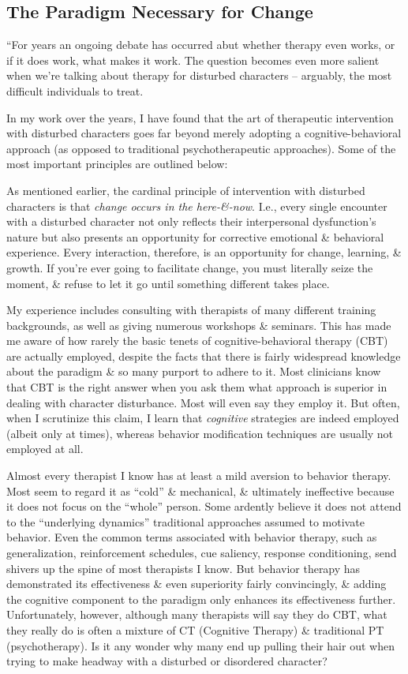 \documentclass{article}
\numberwithin{equation}{section}
\begin{document}
\subsection{The Paradigm Necessary for Change}
``For years an ongoing debate has occurred abut whether therapy even works, or if it does work, what makes it work. The question becomes even more salient when we're talking about therapy for disturbed characters -- arguably, the most difficult individuals to treat.

In my work over the years, I have found that the art of therapeutic intervention with disturbed characters goes far beyond merely adopting a cognitive-behavioral approach (as opposed to traditional psychotherapeutic approaches). Some of the most important principles are outlined below:

As mentioned earlier, the cardinal principle of intervention with disturbed characters is that \textit{change occurs in the here-\&-now}. I.e., every single encounter with a disturbed character not only reflects their interpersonal dysfunction's nature but also presents an opportunity for corrective emotional \& behavioral experience. Every interaction, therefore, is an opportunity for change, learning, \& growth. If you're ever going to facilitate change, you must literally seize the moment, \& refuse to let it go until something different takes place.

My experience includes consulting with therapists of many different training backgrounds, as well as giving numerous workshops \& seminars. This has made me aware of how rarely the basic tenets of cognitive-behavioral therapy (CBT) are actually employed, despite the facts that there is fairly widespread knowledge about the paradigm \& so many purport to adhere to it. Most clinicians know that CBT is the right answer when you ask them what approach is superior in dealing with character disturbance. Most will even say they employ it. But often, when I scrutinize this claim, I learn that \textit{cognitive} strategies are indeed employed (albeit only at times), whereas behavior modification techniques are usually not employed at all.

Almost every therapist I know has at least a mild aversion to behavior therapy. Most seem to regard it as ``cold'' \& mechanical, \& ultimately ineffective because it does not focus on the ``whole'' person. Some ardently believe it does not attend to the ``underlying dynamics'' traditional approaches assumed to motivate behavior. Even the common terms associated with behavior therapy, such as generalization, reinforcement schedules, cue saliency,  response conditioning, send shivers up the spine of most therapists I know. But behavior therapy has demonstrated its effectiveness \& even superiority fairly convincingly, \& adding the cognitive component to the paradigm only enhances its effectiveness further. Unfortunately, however, although many therapists will say they do CBT, what they really do is often a mixture of CT (Cognitive Therapy) \& traditional PT (psychotherapy). Is it any wonder why many end up pulling their hair out when trying to make headway with a disturbed or disordered character?
\end{document}
